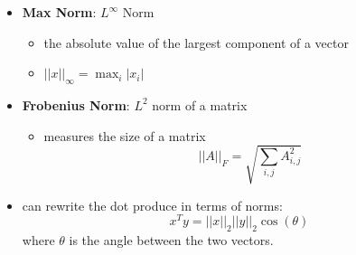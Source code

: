 \begin{itemize}
\begin{itemize}
    \end{itemize}
    \item \textbf{Max Norm}: $L^\infty$ Norm
    \begin{itemize}
        \item the absolute value of the largest component of a vector
        \item $||x||_\infty = \max_i |x_i|$
    \end{itemize}
    \item \textbf{Frobenius Norm}: $L^2$ norm of a matrix
    \begin{itemize}
        \item measures the size of a matrix
        $$ ||A||_F = \sqrt{\sum_{i,j} A_{i,j}^2} $$
    \end{itemize}
    \item can rewrite the dot produce in terms of norms:
    $$ x^T y = ||x||_2 ||y||_2 \cos(\theta) $$
    where $\theta$ is the angle between the two vectors.
\end{itemize}

